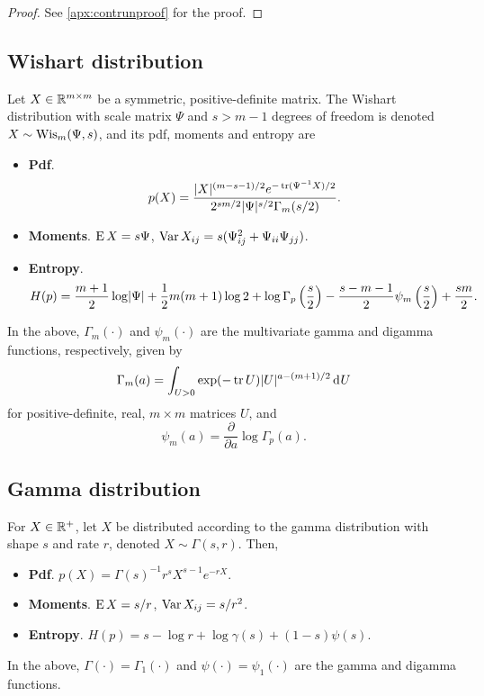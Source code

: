 \begin{proof}
  See \cref{apx:contrunproof} for the proof.
\end{proof}

\subsection{Wishart distribution}

Let $X\in\bbR^{m\times m}$ be a symmetric, positive-definite matrix.
The Wishart distribution with scale matrix $\Psi$ and $s >  m-1$ degrees of freedom is denoted $X \sim \Wis_m(\Psi,s)$, and its pdf, moments and entropy are
\begin{itemize}
  \item \textbf{Pdf}. 
  \[
    p(X) = \frac{\abs{X}^{(m-s-1)/2}e^{-\tr(\Psi^{-1}X)/2}}{2^{sm/2}\abs{\Psi}^{s/2}\Gamma_m(s/2)}.
  \]
  \item \textbf{Moments}. $\E X=s\Psi$, $\Var X_{ij} = s(\Psi_{ij}^2 + \Psi_{ii}\Psi_{jj})$.
  \item \textbf{Entropy}. 
  \[
    H(p) = \frac{m+1}{2}\log\abs{\Psi} + \half m(m+1)\log 2 + \log \Gamma_p \left(\half[s] \right) - \half[s-m-1] \psi_m \left(\half[s] \right) + \half[sm].
  \]
\end{itemize}
In the above, $\Gamma_m(\cdot)$ and $\psi_m(\cdot)$ are the multivariate gamma and digamma functions, respectively, given by
\[
  \Gamma_m(a) = \int_{U>0} \exp(-\tr U) \abs{U}^{a-(m+1)/2} \dint U
\]
for positive-definite, real, $m \times m$ matrices $U$, and
\[
  \psi_m(a) = \frac{\partial}{\partial a}\log \Gamma_p(a).
\]

\subsection{Gamma distribution}

For $X\in\bbR^+$, let $X$ be distributed according to the gamma distribution with shape $s$ and rate $r$, denoted $X\sim\Gamma(s,r)$. 
Then,
\begin{itemize}
  \item \textbf{Pdf}. $p(X) = \Gamma(s)^{-1} r^s X^{s-1} e^{-rX}$.
  \item \textbf{Moments}. $\E X=s/r$, $\Var X_{ij} = s/r^2$.
  \item \textbf{Entropy}. $H(p)=s - \log r + \log \gamma(s) + (1-s)\psi(s)$.
\end{itemize}
In the above, $\Gamma(\cdot) = \Gamma_1(\cdot)$ and $\psi(\cdot) = \psi_1(\cdot)$ are the gamma and digamma functions.
